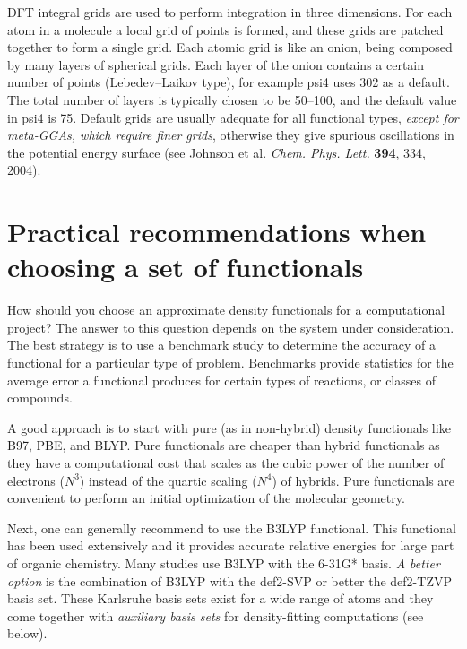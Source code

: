 \documentclass[../Main/notes.tex]{subfiles}
\begin{document}
DFT integral grids are used to perform integration in three dimensions.
For each atom in a molecule a local grid of points is formed, and these grids are patched together to form a single grid.
Each atomic grid is like an onion, being composed by many layers of spherical grids.
Each layer of the onion contains a certain number of points (Lebedev--Laikov type), for example psi4 uses 302 as a default.
The total number of layers is typically chosen to be 50--100, and the default value in psi4 is 75.
Default grids are usually adequate for all functional types, \emph{except for meta-GGAs, which require finer grids}, otherwise they give spurious oscillations in the potential energy surface (see Johnson et al. \textit{Chem. Phys. Lett.} \textbf{394}, 334, 2004).



\section{Practical recommendations when choosing a set of functionals}

How should you choose an approximate density functionals for a computational project?
The answer to this question depends on the system under consideration.
The best strategy is to use a benchmark study to determine the accuracy of a functional for a particular type of problem.
Benchmarks provide statistics for the average error a functional produces for certain types of reactions, or classes of compounds.

A good approach is to start with pure (as in non-hybrid) density functionals like B97, PBE, and BLYP.
Pure functionals are cheaper than hybrid functionals as they have a computational cost that scales as the cubic power of the number of electrons ($N^3$) instead of the quartic scaling ($N^4$) of hybrids.
Pure functionals are convenient to perform an initial optimization of the molecular geometry.

Next, one can generally recommend to use the B3LYP functional. This functional has been used extensively and it provides accurate relative energies for large part of organic chemistry. 
Many studies use B3LYP with the 6-31G* basis. \emph{A better option} is the combination of B3LYP with the def2-SVP or better the def2-TZVP basis set.
These Karlsruhe basis sets exist for a wide range of atoms and they come together with \emph{auxiliary basis sets} for density-fitting computations (see below).
\end{document}

